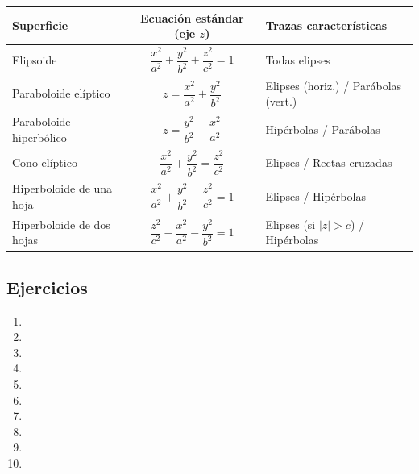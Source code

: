 \begin{center}
\renewcommand{\arraystretch}{2.2}
\begin{tabular}{|l|c|l|}
\hline
\textbf{Superficie} & \textbf{Ecuación estándar (eje $z$)} & \textbf{Trazas características} \\
\hline
Elipsoide & $\dfrac{x^2}{a^2}+\dfrac{y^2}{b^2}+\dfrac{z^2}{c^2}=1$ & Todas elipses \\
\hline
Paraboloide elíptico & $z=\dfrac{x^2}{a^2}+\dfrac{y^2}{b^2}$ & Elipses (horiz.) / Parábolas (vert.) \\
\hline
Paraboloide hiperbólico & $z=\dfrac{y^2}{b^2}-\dfrac{x^2}{a^2}$ & Hipérbolas / Parábolas \\
\hline
Cono elíptico & $\dfrac{x^2}{a^2}+\dfrac{y^2}{b^2}=\dfrac{z^2}{c^2}$ & Elipses / Rectas cruzadas \\
\hline
Hiperboloide de una hoja & $\dfrac{x^2}{a^2}+\dfrac{y^2}{b^2}-\dfrac{z^2}{c^2}=1$ & Elipses / Hipérbolas \\
\hline
Hiperboloide de dos hojas & $\dfrac{z^2}{c^2}-\dfrac{x^2}{a^2}-\dfrac{y^2}{b^2}=1$ & Elipses (si $|z|>c$) / Hipérbolas \\
\hline
\end{tabular}
\end{center}


\subsection{Ejercicios}

\begin{enumerate}
    \item 
    \item 
    \item 
    \item 
    \item 
    \item 
    \item 
    \item 
    \item 
    \item 
\end{enumerate}
